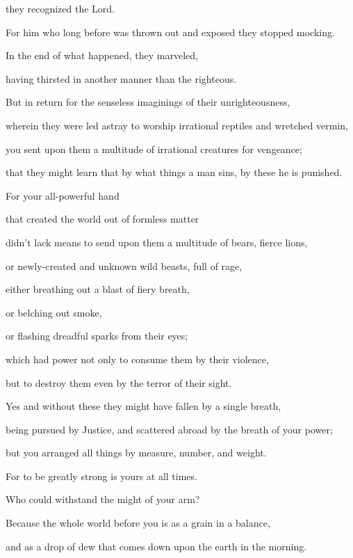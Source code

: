 {\par }{\QB they recognized the Lord.
\par }{\Q {}For him who long before was thrown out and exposed they stopped mocking.
\par }{\QB In the end of what happened, they marveled,
\par }{\QB having thirsted in another manner than the righteous.
\par }{\Q {}But in return for the senseless imaginings of their unrighteousness,
\par }{\QB wherein they were led astray to worship irrational reptiles and wretched vermin,
\par }{\QB you sent upon them a multitude of irrational creatures for vengeance;
\par }{\QB {}that they might learn that by what things a man sins, by these he is punished.
\par }{\Q {}For your all-powerful hand
\par }{\QB that created the world out of formless matter
\par }{\QB didn’t lack means to send upon them a multitude of bears, fierce lions,
\par }{\QB {}or newly-created and unknown wild beasts, full of rage,
\par }{\QB either breathing out a blast of fiery breath,
\par }{\QB or belching out smoke,
\par }{\QB or flashing dreadful sparks from their eyes;
\par }{\Q {}which had power not only to consume them by their violence,
\par }{\QB but to destroy them even by the terror of their sight.
\par }{\Q {}Yes and without these they might have fallen by a single breath,
\par }{\QB being pursued by Justice, and scattered abroad by the breath of your power;
\par }{\QB but you arranged all things by measure, number, and weight.
\par }{\BB \par }{\Q {}For to be greatly strong is yours at all times.
\par }{\QB Who could withstand the might of your arm?
\par }{\Q {}Because the whole world before you is as a grain in a balance,
\par }{\QB and as a drop of dew that comes down upon the earth in the morning.
}
